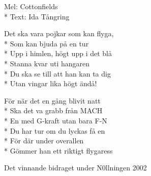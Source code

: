 \begin{SongText}
    \begin{SongInfo}
        Mel: Cottonfields\\*%
        Text: Ida Tångring
    \end{SongInfo}
    \begin{SongVerse}
        Det ska vara pojkar som kan flyga,\\*%
        Som kan bjuda på en tur\\*%
        Upp i himlen, högt upp i det blå\\*%
        Stanna kvar uti hangaren\\*%
        Du ska se till att han kan ta dig\\*%
        Utan vingar lika högt ändå!
    \end{SongVerse}
    \begin{SongVerse}
        För när det en gång blivit natt\\*%
        Ska det va grabb från MACH\\*%
        En med G-kraft utan bara F-N\\*%
        Du har tur om du lyckas få en\\*%
        För där under overallen\\*%
        Gömmer han ett riktigt flygaress
    \end{SongVerse}
    \begin{SongInfo}
        Det vinnande bidraget under N0llningen 2002
    \end{SongInfo}
\end{SongText}
